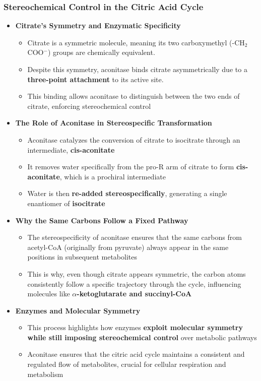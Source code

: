 \documentclass[10pt]{article}
\newcommand{\nc}{$^-$}
\begin{document}
\subsubsection*{Stereochemical Control in the Citric Acid Cycle}
\begin{itemize}
	\item \textbf{Citrate's Symmetry and Enzymatic Specificity}
	\begin{itemize}
        \item Citrate is a symmetric molecule, meaning its two carboxymethyl (-CH$_2$COO\nc) groups are chemically equivalent.  
        \item Despite this symmetry, aconitase binds citrate asymmetrically due to a \textbf{three-point attachment} to its active site.  
        \item This binding allows aconitase to distinguish between the two ends of citrate, enforcing stereochemical control
    \end{itemize}
    \item \textbf{The Role of Aconitase in Stereospecific Transformation}
    \begin{itemize}
        \item Aconitase catalyzes the conversion of citrate to isocitrate through an intermediate, \textbf{cis-aconitate}
        \item It removes water specifically from the pro-R arm of citrate to form \textbf{cis-aconitate}, which is a prochiral intermediate
        \item Water is then \textbf{re-added stereospecifically}, generating a single enantiomer of \textbf{isocitrate}
    \end{itemize}
    \item \textbf{Why the Same Carbons Follow a Fixed Pathway}
    \begin{itemize}
        \item The stereospecificity of aconitase ensures that the same carbons from acetyl-CoA (originally from pyruvate) always appear in the same positions in subsequent metabolites
        \item This is why, even though citrate appears symmetric, the carbon atoms consistently follow a specific trajectory through the cycle,
        influencing molecules like \textbf{$\alpha$-ketoglutarate and succinyl-CoA}
    \end{itemize}
    \item \textbf{Enzymes and Molecular Symmetry}
    \begin{itemize}
        \item This process highlights how enzymes \textbf{exploit molecular symmetry while still imposing stereochemical control} over metabolic pathways
        \item Aconitase ensures that the citric acid cycle maintains a consistent and regulated flow of metabolites, crucial for cellular respiration and metabolism
    \end{itemize}
\end{itemize}
\end{document}
